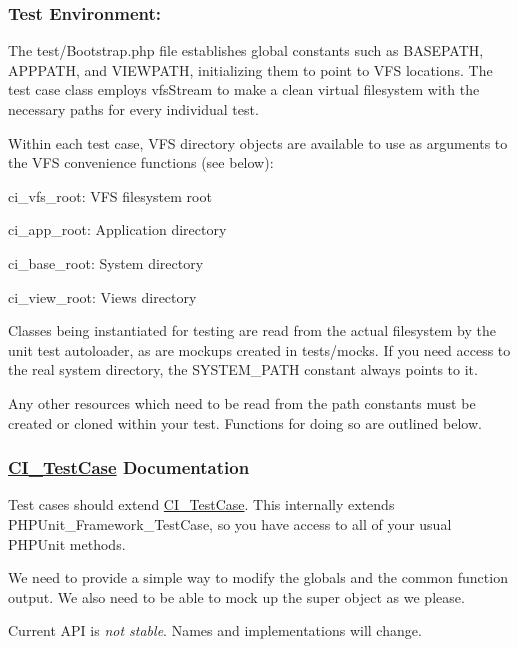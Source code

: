 \subsubsection*{Test Environment\+:}

The test/\+Bootstrap.\+php file establishes global constants such as B\+A\+S\+E\+P\+A\+T\+H, A\+P\+P\+P\+A\+T\+H, and V\+I\+E\+W\+P\+A\+T\+H, initializing them to point to V\+F\+S locations. The test case class employs vfs\+Stream to make a clean virtual filesystem with the necessary paths for every individual test.

Within each test case, V\+F\+S directory objects are available to use as arguments to the V\+F\+S convenience functions (see below)\+:


\begin{DoxyItemize}
\item ci\+\_\+vfs\+\_\+root\+: V\+F\+S filesystem root
\item ci\+\_\+app\+\_\+root\+: Application directory
\item ci\+\_\+base\+\_\+root\+: System directory
\item ci\+\_\+view\+\_\+root\+: Views directory
\end{DoxyItemize}

Classes being instantiated for testing are read from the actual filesystem by the unit test autoloader, as are mockups created in tests/mocks. If you need access to the real system directory, the S\+Y\+S\+T\+E\+M\+\_\+\+P\+A\+T\+H constant always points to it.

Any other resources which need to be read from the path constants must be created or cloned within your test. Functions for doing so are outlined below.

\subsubsection*{\hyperlink{class_c_i___test_case}{C\+I\+\_\+\+Test\+Case} Documentation}

Test cases should extend \hyperlink{class_c_i___test_case}{C\+I\+\_\+\+Test\+Case}. This internally extends P\+H\+P\+Unit\+\_\+\+Framework\+\_\+\+Test\+Case, so you have access to all of your usual P\+H\+P\+Unit methods.

We need to provide a simple way to modify the globals and the common function output. We also need to be able to mock up the super object as we please.

Current A\+P\+I is {\itshape not stable}. Names and implementations will change. 


